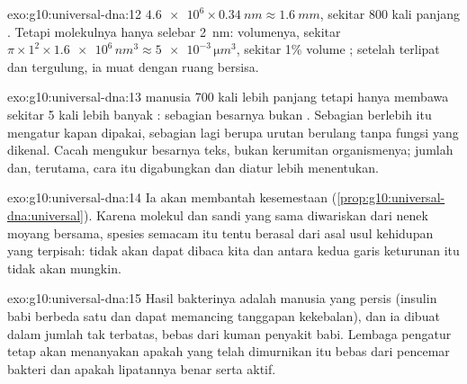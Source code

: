 \begin{solution}{exo:g10:universal-dna:12}
$\num{4.6e6} \times \qty{0.34}{nm} \approx \qty{1.6}{mm}$, sekitar 800
kali panjang . Tetapi molekulnya hanya selebar \qty{2}{nm}:
volumenya, sekitar $\pi \times 1^2 \times \num{1.6e6}\,
\unit{nm^3} \approx \num{5e-3}\,\unit{\micro m^3}$, sekitar 1\% volume
; setelah terlipat dan tergulung, ia muat dengan ruang bersisa.
\end{solution}

\begin{solution}{exo:g10:universal-dna:13}
 manusia 700 kali lebih panjang tetapi hanya membawa sekitar 5 kali
lebih banyak : sebagian besarnya bukan . Sebagian  berlebih
itu mengatur kapan  dipakai, sebagian lagi berupa urutan berulang
tanpa fungsi yang dikenal. Cacah  mengukur besarnya teks, bukan
kerumitan organismenya; jumlah  dan, terutama, cara  itu
digabungkan dan diatur lebih menentukan.
\end{solution}

\begin{solution}{exo:g10:universal-dna:14}
Ia akan membantah kesemestaan 
(\cref{prop:g10:universal-dna:universal}). Karena molekul dan sandi
yang sama diwariskan dari nenek moyang bersama, spesies semacam itu
tentu berasal dari asal usul kehidupan yang terpisah:  tidak akan
dapat dibaca  kita dan  antara kedua garis keturunan itu
tidak akan mungkin.
\end{solution}

\begin{solution}{exo:g10:universal-dna:15}
Hasil bakterinya adalah  manusia yang persis (insulin babi
berbeda satu  dan dapat memancing tanggapan kekebalan), dan
ia dibuat dalam jumlah tak terbatas, bebas dari kuman penyakit babi.
Lembaga pengatur tetap akan menanyakan apakah  yang telah
dimurnikan itu bebas dari pencemar bakteri dan apakah lipatannya benar
serta aktif.
\end{solution}


